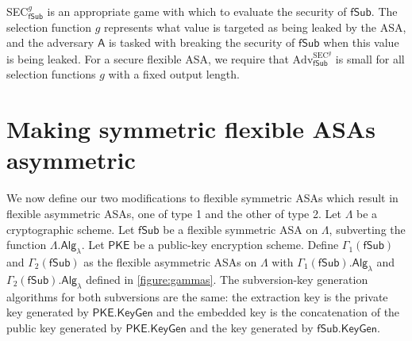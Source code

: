 SEC$^g_\mathsf{fSub}$ is an appropriate game with which to evaluate the security of $\mathsf{fSub}$. The selection function $g$ represents what value is targeted as being leaked by the ASA, and the adversary $\mathsf{A}$ is tasked with breaking the security of $\mathsf{fSub}$ when this value is being leaked. For a secure flexible ASA, we require that $\mathrm{Adv}^{\mathrm{SEC}^g}_\mathsf{fSub}$ is small for all selection functions $g$ with a fixed output length.

\section{Making symmetric flexible ASAs asymmetric}
We now define our two modifications to flexible symmetric ASAs which result in flexible asymmetric ASAs, one of type 1 and the other of type 2. Let $\mathsf{\Lambda}$ be a cryptographic scheme. Let $\mathsf{fSub}$ be a flexible symmetric ASA on $\mathsf{\Lambda}$, subverting the function $\mathsf{\Lambda.Alg}_\lambda$. Let $\mathsf{PKE}$ be a public-key encryption scheme. Define $\Gamma_1(\mathsf{fSub})$ and $\Gamma_2(\mathsf{fSub})$ as the flexible asymmetric ASAs on $\mathsf{\Lambda}$ with $\Gamma_1(\mathsf{fSub}).\mathsf{Alg}_\lambda$ and $\Gamma_2(\mathsf{fSub}).\mathsf{Alg}_\lambda$ defined in \autoref{figure:gammas}. The subversion-key generation algorithms for both subversions are the same: the extraction key is the private key generated by $\mathsf{PKE.KeyGen}$ and the embedded key is the concatenation of the public key generated by $\mathsf{PKE.KeyGen}$ and the key generated by $\mathsf{fSub.KeyGen}$.

